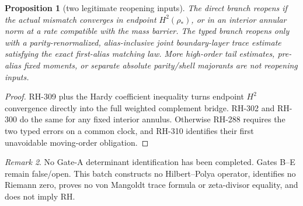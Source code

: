 \documentclass[11pt]{article}
\newtheorem{proposition}{Proposition}[section]
\theoremstyle{remark}\newtheorem{remark}[proposition]{Remark}
\begin{document}
\begin{proposition}[two legitimate reopening inputs]
The direct branch reopens if the actual mismatch converges in endpoint
$H^2(\rho_*)$, or in an interior annular norm at a rate compatible with the
mass barrier.  The typed branch reopens only with a parity-renormalized,
alias-inclusive joint boundary-layer trace estimate satisfying the exact
first-alias matching law.  More high-order tail estimates, pre-alias fixed
moments, or separate absolute parity/shell majorants are not reopening
inputs.
\end{proposition}
\begin{proof}
RH-309 plus the Hardy coefficient inequality turns endpoint $H^2$
convergence directly into the full weighted complement bridge.  RH-302 and
RH-300 do the same for any fixed interior annulus.  Otherwise RH-288 requires
the two typed errors on a common clock, and RH-310 identifies their first
unavoidable moving-order obligation.
\end{proof}

\begin{remark}
No Gate-A determinant identification has been completed.  Gates B--E remain
false/open.  This batch constructs no Hilbert--Polya operator, identifies no
Riemann zero, proves no von Mangoldt trace formula or zeta-divisor equality,
and does not imply RH.
\end{remark}
\end{document}
